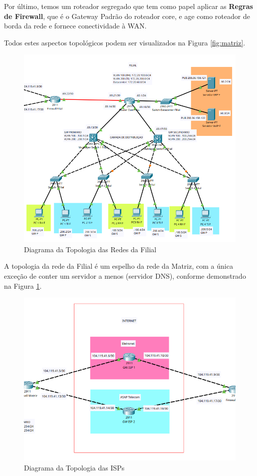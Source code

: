 \documentclass[a4paper, 12pt]{article}
\begin{document}
Por último, temos um roteador segregado que tem como papel aplicar as \textbf{Regras de Firewall}, que é o Gateway Padrão do roteador core, e age como roteador de borda da rede e fornece conectividade à WAN.

Todos estes aspectos topológicos podem ser visualizados na Figura \ref{fig:matriz}.

\begin{figure}[H]
    \centering
    \includegraphics[width=0.8\linewidth]{filial.png}
    \caption{Diagrama da Topologia das Redes da Filial}
    \label{fig:filial}
\end{figure}

A topologia da rede da Filial é um espelho da rede da Matriz, com a única exceção de conter um servidor a menos (servidor DNS), conforme demonstrado na Figura \ref{fig:filial}. 

\begin{figure}[H]
    \centering
    \includegraphics[width=0.8\linewidth]{isp.png}
    \caption{Diagrama da Topologia das ISPs}
    \label{fig:isp}
\end{figure}
\end{document}
